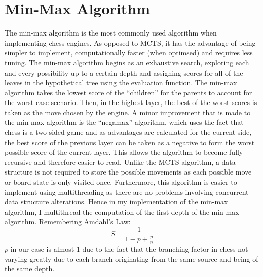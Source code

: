 \chapter{Min-Max Algorithm}
The min-max algorithm is the most commonly used algorithm when implementing chess engines. As opposed to MCTS, it has the advantage of being simpler to implement, computationally faster (when optimsed) and requires less tuning. The min-max algorithm begins as an exhaustive search, exploring each and every possibility up to a certain depth and assigning scores for all of the leaves in the hypothetical tree using the evaluation function. The min-max algorithm takes the lowest score of the ``children'' for the parents to account for the worst case scenario. Then, in the highest layer, the best of the worst scores is taken as the move chosen by the engine. A minor improvement that is made to the min-max algorithm is the ``negamax'' algorithm, which uses the fact that chess is a two sided game and as advantages are calculated for the current side, the best score of the previous layer can be taken as a negative to form the worst possible score of the current layer. This allows the algorithm to become fully recursive and therefore easier to read. Unlike the MCTS algorithm, a data structure is not required to store the possible movements as each possible move or board state is only visited once. Furthermore, this algorithm is easier to implement using multithreading as there are no problems involving concurrent data structure alterations. Hence in my implementation of the min-max algorithm, I multithread the computation of the first depth of the min-max algorithm. Remembering Amdahl's Law: \[S = \frac{1}{1 - p + \frac{p}{n}}\] $p$ in our case is almost 1 due to the fact that the branching factor in chess not varying greatly due to each branch originating from the same source and being of the same depth. 
